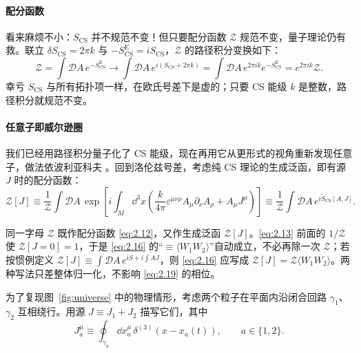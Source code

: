 \paragraph{配分函数} %
看来麻烦不小：$S_{\mathrm{CS}}$ 并不规范不变！但只要配分函数 $\mathcal{Z}$ 规范不变，量子理论仍有救。联立 $\delta S_{\mathrm{CS}}=2\pi k$ 与 $-S^{\mathrm{E}}_{\mathrm{CS}}=iS_{\mathrm{CS}}$，$\mathcal{Z}$ 的路径积分变换如下：
\begin{equation}\tag{2.12}\label{eq:2.12}
  \mathcal{Z} = \int\mathcal{D}A\,e^{-S^{\mathrm{E}}_{\mathrm{CS}}}
  \longrightarrow \int\mathcal{D}A\,e^{i(S_{\mathrm{CS}}+2\pi k)}
  = \int\mathcal{D}A\,e^{2\pi ik}e^{-S^{\mathrm{E}}_{\mathrm{CS}}}
  = e^{2\pi ik}\mathcal{Z} .
\end{equation}
幸亏 $S_{\mathrm{CS}}$ 与所有拓扑项一样，在欧氏号差下是虚的；只要 CS 能级 $k$ 是整数，路径积分就规范不变。

\paragraph{任意子即威尔逊圈} %
我们已经用路径积分量子化了 CS 能级，现在再用它从更形式的视角重新发现任意子，做法依波利亚科夫 \cite{polyakov1988}。回到洛伦兹号差，考虑纯 CS 理论的生成泛函，即有源 $J$ 时的配分函数：
\begin{equation}\tag{2.13}\label{eq:2.13}
  \mathcal{Z}[J] \equiv \frac{1}{\mathcal{Z}}\int\mathcal{D}A\,\exp\left[i\int_M \dd^3x\left(\frac{k}{4\pi}\varepsilon^{\mu\nu\rho}A_\mu\partial_\nu A_\rho + A_\mu J^\mu\right)\right]
  \equiv \frac{1}{\mathcal{Z}}\int\mathcal{D}A\,e^{i\widetilde{S}_{\mathrm{CS}}[A,J]} .
\end{equation}

\begin{yizhu}[易错点]
同一字母 $\mathcal{Z}$ 既作配分函数 \eqref{eq:2.12}，又作生成泛函 $\mathcal{Z}[J]$。\eqref{eq:2.13} 前面的 $1/\mathcal{Z}$ 使 $\mathcal{Z}[J=0]=1$，于是 \eqref{eq:2.16} 的“$\equiv\langle W_1W_2\rangle$”自动成立，不必再除一次 $\mathcal{Z}$；若按惯例定义 $\mathcal{Z}[J]\equiv\int\mathcal{D}A\,e^{iS+i\int A J}$，则 \eqref{eq:2.16} 应写成 $\mathcal{Z}[J]=\mathcal{Z}\langle W_1W_2\rangle$。两种写法只差整体归一化，不影响 \eqref{eq:2.19} 的相位。
\end{yizhu}

为了复现图~\ref{fig:universe} 中的物理情形，考虑两个粒子在平面内沿闭合回路 $\gamma_1$、$\gamma_2$ 互相绕行。用源 $J\equiv J_1+J_2$ 描写它们，其中
\begin{equation}\tag{2.14}\label{eq:2.14}
  J_a^\mu \equiv \oint_{\gamma_a}\dd x_a^\mu\,\delta^{(3)}(x-x_a(t)), \qquad a\in\{1,2\} .
\end{equation}

